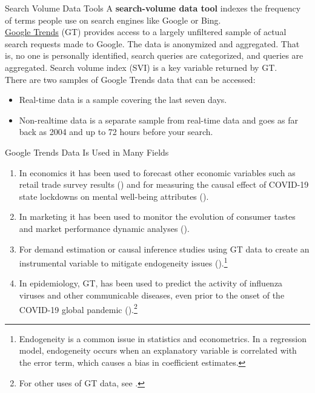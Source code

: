 \documentclass[pdf]{beamer}
\newcommand{\empr}[1]{{\color{franklinblue}\textbf{#1}}}
\theoremstyle{remark}
\theoremstyle{definition}
\begin{document}
\begin{frame}[t]{Search Volume Data Tools}
A \empr{search-volume data tool} indexes the frequency of terms people use on search engines like Google or Bing. \\
\vspace{1.5ex}
\href{https://support.google.com/trends/answer/6248105?hl=en&ref_topic=6248052}{Google Trends} (GT) provides access to a largely unfiltered sample of actual search requests made to Google. The data is anonymized and aggregated.  That is, no one is personally identified, search queries are categorized, and queries are aggregated. Search volume index (SVI) is a key variable returned by GT.\\
\vspace{1.5ex}
There are two samples of Google Trends data that can be accessed:
\begin{itemize}
  \item Real-time data is a sample covering the last seven days.
  \item Non-realtime data is a separate sample from real-time data and goes as far back as 2004 and up to 72 hours before your search.
\end{itemize}
 \end{frame}

\begin{frame}[t]{Google Trends Data Is Used in Many Fields}
\small
\begin{enumerate}
\item In economics it has been used to forecast other economic variables such as retail trade survey results (\cite{robin2018}) and for measuring the causal effect of COVID-19 state lockdowns on mental well-being attributes (\cite{brodeur2021}).
\item In marketing it has been used to monitor the evolution of consumer tastes and market performance dynamic analyses (\cite{du2015}). 
\item For demand estimation or causal inference studies using GT data to create  an instrumental variable to mitigate endogeneity issues (\cite{barron2020}).\footnote{Endogeneity is a common issue in statistics and econometrics.  In a regression model, endogeneity occurs when an explanatory variable is correlated with the error term, which causes a bias in coefficient estimates.}
\item In epidemiology, GT, has been used to predict the activity of influenza viruses and other communicable diseases, even prior to the onset of the COVID-19 global pandemic (\cite{ginsberg2009}).\footnote{For other uses of GT data, see \cite{jun2018}.}
\end{enumerate}
\end{frame}
\end{document}
